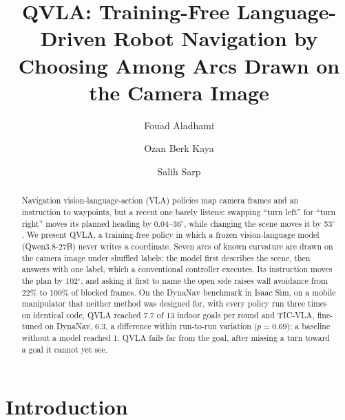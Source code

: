 \documentclass[runningheads]{llncs}
\begin{document}
%
\title{QVLA: Training-Free Language-Driven Robot Navigation by Choosing Among Arcs Drawn on the Camera Image}
%
\author{Fouad Aladhami \and Ozan Berk Kaya \and Salih Sarp}
%
\maketitle
%
\begin{abstract}
Navigation vision-language-action (VLA) policies map camera frames and an instruction to
waypoints, but a recent one barely listens: swapping ``turn left'' for ``turn right'' moves
its planned heading by 0.04--36$^\circ$, while changing the scene moves it by 53$^\circ$.
We present QVLA, a training-free policy in which a frozen vision-language model
(Qwen3.8-27B) never writes a coordinate. Seven arcs of known curvature are drawn on the camera
image under shuffled labels; the model first describes the scene, then answers with one
label, which a conventional controller executes. Its instruction moves the plan by
102$^\circ$, and asking it first to name the open side raises wall avoidance from 22\% to
100\% of blocked frames. On the DynaNav benchmark in Isaac Sim, on a mobile manipulator that
neither method was designed for, with every policy run three times on identical code, QVLA
reached 7.7 of 13 indoor goals per round and TIC-VLA, fine-tuned on DynaNav, 6.3, a
difference within run-to-run variation ($p=0.69$); a baseline without a model reached 1.
QVLA fails far from the goal, after missing a turn toward a goal it cannot yet see.

\end{abstract}
%
%
\section{Introduction}
\label{sec:intro}
\end{document}
